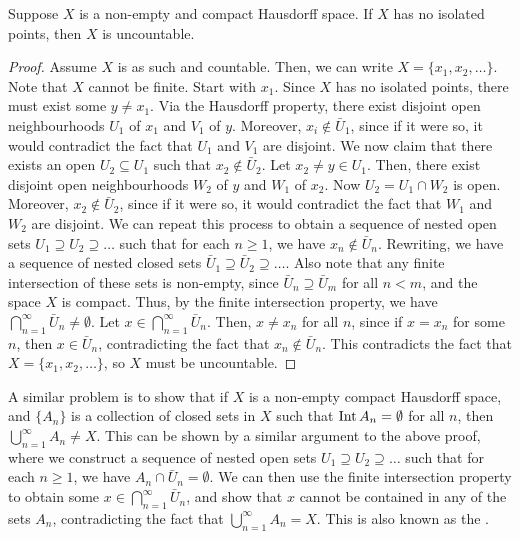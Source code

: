 \begin{theorem}
    Suppose $X$ is a non-empty and compact Hausdorff space. If $X$ has no isolated points, then $X$ is uncountable.
\end{theorem}
\begin{proof}
    Assume $X$ is as such and countable. Then, we can write $X = \{x_{1},x_{2},\ldots\}$. Note that $X$ cannot be finite. Start with $x_{1}$. Since $X$ has no isolated points, there must exist some $y \neq x_{1}$. Via the Hausdorff property, there exist disjoint open neighbourhoods $U_{1}$ of $x_{1}$ and $V_{1}$ of $y$. Moreover, $x_{i} \notin \bar{U}_{1}$, since if it were so, it would contradict the fact that $U_{1}$ and $V_{1}$ are disjoint. We now claim that there exists an open $U_{2} \subseteq U_{1}$ such that $x_{2} \notin \bar{U}_{2}$. Let $x_{2} \neq y \in U_{1}$. Then, there exist disjoint open neighbourhoods $W_{2}$ of $y$ and $W_{1}$ of $x_{2}$. Now $U_{2} = U_{1} \cap W_{2}$ is open. Moreover, $x_{2} \notin \bar{U}_{2}$, since if it were so, it would contradict the fact that $W_{1}$ and $W_{2}$ are disjoint. We can repeat this process to obtain a sequence of nested open sets $U_{1} \supseteq U_{2} \supseteq \ldots$ such that for each $n \geq 1$, we have $x_{n} \notin \bar{U}_{n}$. Rewriting, we have a sequence of nested closed sets $\bar{U}_{1} \supseteq \bar{U}_{2} \supseteq \ldots$. Also note that any finite intersection of these sets is non-empty, since $\bar{U}_{n} \supseteq \bar{U}_{m}$ for all $n < m$, and the space $X$ is compact. Thus, by the finite intersection property, we have $\bigcap_{n=1}^{\infty} \bar{U}_{n} \neq \emptyset$. Let $x \in \bigcap_{n=1}^{\infty} \bar{U}_{n}$. Then, $x \neq x_{n}$ for all $n$, since if $x = x_{n}$ for some $n$, then $x \in \bar{U}_{n}$, contradicting the fact that $x_{n} \notin \bar{U}_{n}$. This contradicts the fact that $X = \{x_{1}, x_{2}, \ldots\}$, so $X$ must be uncountable.
\end{proof}

A similar problem is to show that if $X$ is a non-empty compact Hausdorff space, and $\{A_{n}\}$ is a collection of closed sets in $X$ such that $\operatorname{Int} A_{n} = \emptyset$ for all $n$, then $\bigcup_{n=1}^{\infty} A_{n} \neq X$. This can be shown by a similar argument to the above proof, where we construct a sequence of nested open sets $U_{1} \supseteq U_{2} \supseteq \ldots$ such that for each $n \geq 1$, we have $A_{n} \cap \bar{U}_{n} = \emptyset$. We can then use the finite intersection property to obtain some $x \in \bigcap_{n=1}^{\infty} \bar{U}_{n}$, and show that $x$ cannot be contained in any of the sets $A_{n}$, contradicting the fact that $\bigcup_{n=1}^{\infty} A_{n} = X$. This is also known as the .


